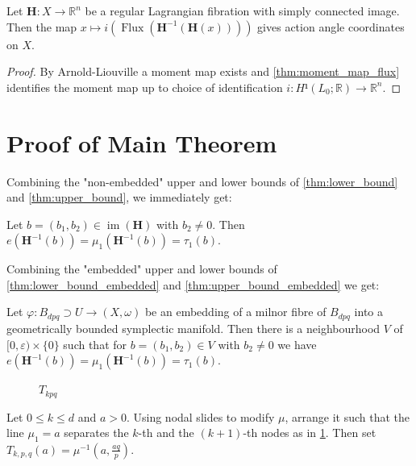 \documentclass[12pt,a4paper,draft]{scrartcl}
\DeclareMathOperator{\im}{im}
\DeclareMathOperator{\Flux}{Flux}
\begin{document}
\begin{corollary}
  Let $\symbf{H} \colon X → ℝ^n$ be a regular Lagrangian fibration with simply connected image. Then the map $x ↦ i(\Flux(\symbf{H}^{-1}(\symbf{H}(x))))$ gives action angle coordinates on $X$.
\end{corollary}
\begin{proof}
  By Arnold-Liouville a moment map exists and \cref{thm:moment_map_flux} identifies the moment map up to choice of identification $i \colon H¹(L_0;ℝ) → ℝ^n$.
\end{proof}

\section{Proof of Main Theorem}

Combining the "non-embedded" upper and lower bounds of \cref{thm:lower_bound} and \cref{thm:upper_bound}, we immediately get:

\begin{theorem}
  \label{thm:displacement_energy}
  Let $b=(b_1,b_2) ∈ \im(\symbf{H})$ with $b_2 ≠ 0$. Then $e(\symbf{H}^{-1}(b)) = μ_1(\symbf{H}^{-1}(b)) = τ_1(b)$.
\end{theorem}

Combining the "embedded" upper and lower bounds of \cref{thm:lower_bound_embedded} and \cref{thm:upper_bound_embedded} we get:

\begin{theorem}
  \label{thm:displacement_energy_embedded}
  Let $φ \colon B_{dpq} ⊃ U → (X,ω)$ be an embedding of a milnor fibre of $B_{dpq}$ into a geometrically bounded symplectic manifold. Then there is a neighbourhood $V$ of $[0,ε) × \{0\}$ such that for $b = (b_1,b_2) ∈ V$ with $b_2 ≠ 0$ we have $e(\symbf{H}^{-1}(b)) = μ_1(\symbf{H}^{-1}(b)) = τ_1(b)$.
\end{theorem}

\begin{figure}
  \centering
  \caption{$T_{kpq}$}
  \label{fig:tkpq_def}
\end{figure}

\begin{definition}
  Let $0 ≤ k ≤ d$ and $a>0$.
  Using nodal slides to modify $μ$, arrange it such that the line $μ_1 = a$ separates the $k$-th and the $(k+1)$-th nodes as in \cref{fig:tkpq_def}.
  Then set $T_{k,p,q}(a) = μ^{-1}(a,\frac{aq}{p})$.
\end{definition}
\end{document}
